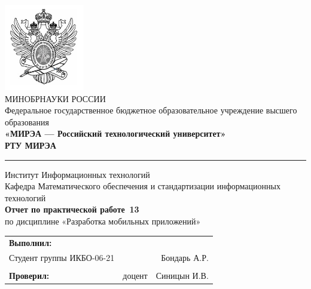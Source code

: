 \begin{titlepage}
	
	\thispagestyle{fancy}
	\renewcommand{\headrulewidth}{0pt}
	\setlength{\headheight}{17.0pt}

	\begin{center}
		\includegraphics[scale=0.5]{./res/logo}\\ %
		МИНОБРНАУКИ РОССИИ\\
		Федеральное государственное бюджетное образовательное
		учреждение высшего образования\\
		\textbf{«МИРЭА --- Российский технологический университет»}\\
		\textbf{\large РТУ МИРЭА}\\
		\bigskip \hrule \smallskip
		Институт Информационных технологий\\
		\vfill
		Кафедра Математического обеспечения и стандартизации
		информационных технологий\\
		\vfill
		\textbf{\large Отчет по практической работе \No\,13}\\
		по дисциплине «Разработка мобильных приложений»\\
		\vfill
		\vfill
		\begin{tabular}{lrr}
			\textbf{Выполнил:} & &\\
			Студент группы ИКБО-06-21 & & Бондарь А.Р. \\\\
			\textbf{Проверил:} &  доцент & Синицын И.В. \\
		\end{tabular}
		\vfill
	\end{center}
\end{titlepage}
\setcounter{page}{2}
\clearpage

